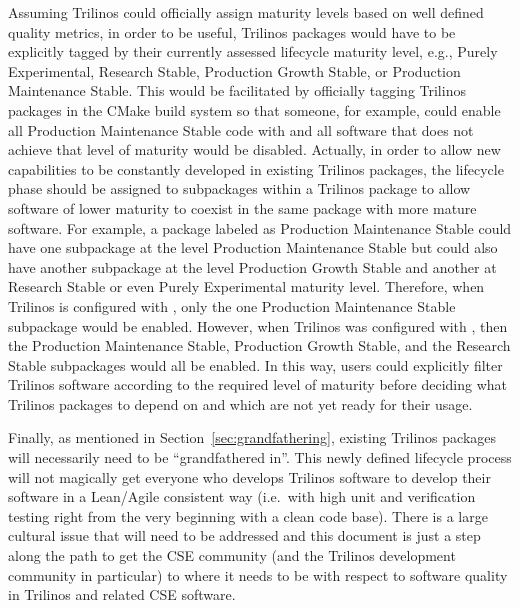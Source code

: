 \documentclass[11pt]{SANDreport}
\begin{document}
Assuming Trilinos could officially assign maturity levels based on
well defined quality metrics, in order to be useful, Trilinos packages
would have to be explicitly tagged by their currently assessed
lifecycle maturity level, e.g., Purely Experimental, Research Stable,
Production Growth Stable, or Production Maintenance Stable.  This would
be facilitated by officially tagging Trilinos packages in the CMake
build system so that someone, for example, could enable all Production
Maintenance Stable code with
{} and all software that does not
achieve that level of maturity would be disabled.  Actually, in order
to allow new capabilities to be constantly developed in existing
Trilinos packages, the lifecycle phase should be assigned to
subpackages within a Trilinos package to allow software of lower
maturity to coexist in the same package with more mature software.
For example, a package labeled as Production Maintenance Stable could
have one subpackage at the level Production Maintenance Stable but
could also have another subpackage at the level Production Growth
Stable and another at Research Stable or even Purely Experimental
maturity level.  Therefore, when Trilinos is configured with
{}, only the one Production Maintenance
Stable subpackage would be enabled.  However, when Trilinos was
configured with {}, then the Production Maintenance Stable, Production
Growth Stable, and the Research Stable subpackages would all be
enabled.  In this way, users could explicitly filter Trilinos software
according to the required level of maturity before deciding what
Trilinos packages to depend on and which are not yet ready for their
usage.

Finally, as mentioned in Section~\ref{sec:grandfathering}, existing
Trilinos packages will necessarily need to be ``grandfathered in''.
This newly defined lifecycle process will not magically get everyone
who develops Trilinos software to develop their software in a
Lean/Agile consistent way (i.e.\ with high unit and verification
testing right from the very beginning with a clean code base).  There
is a large cultural issue that will need to be addressed and this
document is just a step along the path to get the CSE community (and
the Trilinos development community in particular) to where it needs to
be with respect to software quality in Trilinos and related CSE
software.
\end{document}
